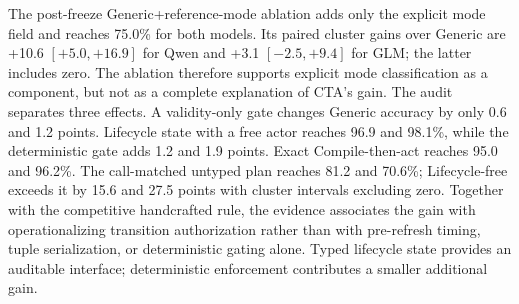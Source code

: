 \documentclass[10pt]{article}
\begin{document}
The post-freeze Generic+reference-mode ablation adds only the explicit mode field and reaches
75.0\% for both models. Its paired cluster gains over Generic are +10.6
$[+5.0,+16.9]$ for Qwen and +3.1 $[-2.5,+9.4]$ for GLM; the latter includes zero. The
ablation therefore supports explicit mode classification as a component, but not as a complete
explanation of CTA's gain. The audit separates three effects. A validity-only gate changes Generic accuracy by only
0.6 and 1.2 points. Lifecycle state with a free actor reaches 96.9 and 98.1\%, while the
deterministic gate adds 1.2 and 1.9 points. Exact Compile-then-act reaches 95.0 and 96.2\%.
The call-matched untyped plan reaches 81.2 and 70.6\%; Lifecycle-free exceeds it by 15.6 and
27.5 points with cluster intervals excluding zero. Together with the competitive handcrafted
rule, the evidence associates the gain with operationalizing transition authorization rather than
with pre-refresh timing, tuple serialization, or deterministic gating alone. Typed lifecycle state
provides an auditable interface; deterministic enforcement contributes a smaller additional gain.
\end{document}
